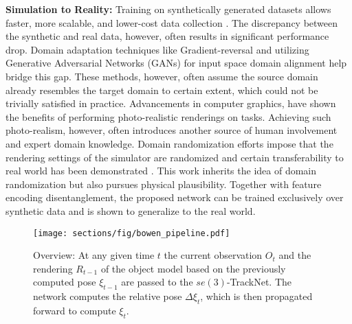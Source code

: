 \documentclass[letterpaper, 10 pt, conference]{ieeeconf}
\begin{document}
\noindent \textbf{Simulation to Reality:} Training on synthetically generated datasets allows faster, more scalable, and lower-cost data collection \cite{tobin2017domain}. The
discrepancy between the synthetic and real
data, however, often results in significant performance drop. Domain adaptation
techniques like Gradient-reversal \cite{ganin2014unsupervised} and
utilizing Generative Adversarial Networks (GANs) for input space
domain alignment \cite{shrivastava2017learning} help bridge this
gap. These methods, however, often assume the source domain already
resembles the target domain to certain extent, which could not be
trivially satisfied in practice. Advancements in computer graphics, \cite{yosinski2014transferable,movshovitz2016useful}
have shown the
benefits of performing photo-realistic renderings on tasks. Achieving such photo-realism, however, often introduces another source of
human involvement and expert domain knowledge.  Domain randomization efforts impose that the rendering settings of the simulator are randomized and certain transferability to real world has been demonstrated \cite{tobin2017domain}. This work inherits the idea of domain randomization but also pursues physical plausibility. Together with feature encoding disentanglement, the proposed network can be trained exclusively over synthetic data and is shown to generalize to the real world.

\begin{figure}[h]
  \centering
  \texttt{[image: sections/fig/bowen\_pipeline.pdf]}
  \vspace{-.3in}
  \caption{Overview: At any given time $t$ the current observation $O_t$ and the rendering $R_{t-1}$ of the object model based on the previously computed pose $\xi_{t-1}$ are passed to the $se(3)$-TrackNet. The network computes the relative pose $\Delta\xi_{t}$, which is then propagated forward to compute $\xi_t$.}
  \label{fig:overview}
\end{figure}
 
\end{document}
